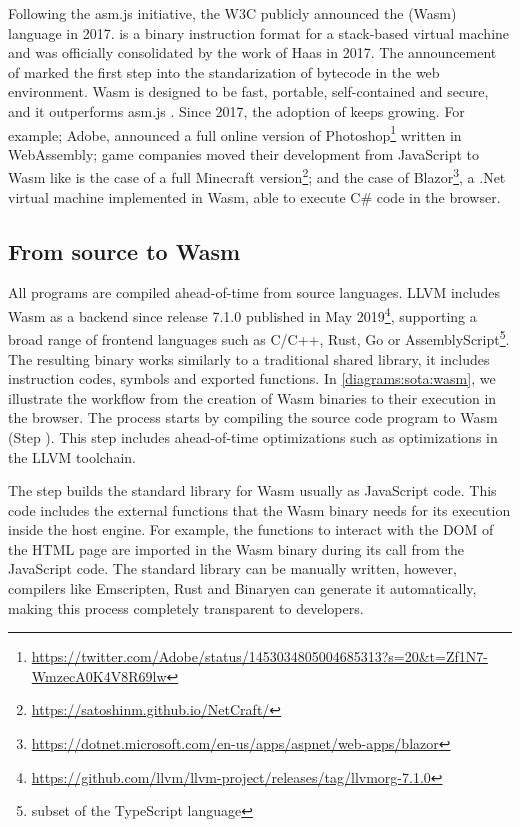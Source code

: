 Following the asm.js initiative, the W3C publicly announced the \wasm (Wasm) language in 2017. \wasm is a binary instruction format for a stack-based virtual machine and was officially consolidated by the work of Haas \etal \cite{Haas_2017} in 2017. The announcement of \wasm marked the first step into the standarization of bytecode in the web environment. Wasm  is designed to be fast, portable, self-contained and secure, and it outperforms asm.js \cite{Haas_2017}. Since 2017, the adoption of \wasm keeps growing. For example; Adobe, announced a full online version of Photoshop\footnote{\url{https://twitter.com/Adobe/status/1453034805004685313?s=20&t=Zf1N7-WmzecA0K4V8R69lw}} written in WebAssembly;  game companies moved their development from JavaScript to Wasm like is the case of a full Minecraft version\footnote{\url{https://satoshinm.github.io/NetCraft/}}; and the case of Blazor\footnote{\url{https://dotnet.microsoft.com/en-us/apps/aspnet/web-apps/blazor}}, a .Net virtual machine implemented in Wasm, able to execute C\# code in the browser.


\subsection{From source to Wasm}

All \wasm programs are compiled ahead-of-time from source languages. LLVM includes Wasm  as a backend since release 7.1.0 published in May 2019\footnote{\url{https://github.com/llvm/llvm-project/releases/tag/llvmorg-7.1.0}}, supporting a broad range of frontend languages such as C/C++, Rust, Go or AssemblyScript\footnote{subset of the TypeScript language}. The resulting binary works similarly to a traditional shared library, it includes instruction codes, symbols and exported functions. In \autoref{diagrams:sota:wasm}, we illustrate the workflow from the creation of Wasm  binaries to their execution in the browser. The process starts by compiling the source code program to Wasm  (Step ). This step includes ahead-of-time optimizations such as optimizations in the LLVM toolchain. 


The step  builds the standard library for Wasm  usually as JavaScript  code. This code includes the external functions that the Wasm  binary needs for its execution inside the host engine. For example, the functions to interact with the DOM of the HTML page are imported in the Wasm  binary during its call from the JavaScript code. The standard library can be manually written, however, compilers like Emscripten, Rust and Binaryen can generate it automatically, making this process completely transparent to developers.

